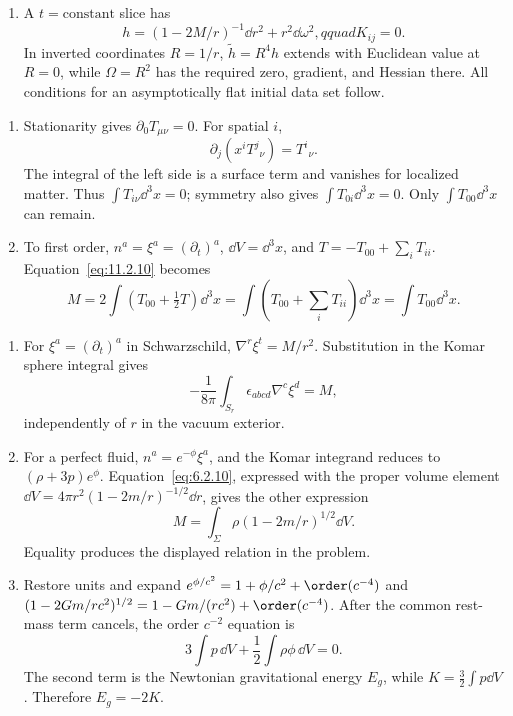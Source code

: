 \begin{enumerate}[leftmargin=2.8em,itemsep=1.2em]
\begin{enumerate}[label=\alph*),leftmargin=2em]
\item A \(t=\text{constant}\) slice has
\[
 h=(1-2M/r)^{-1}\dd r^2+r^2\dd\omega^2,qquad K_{ij}=0.
\]
In inverted coordinates \(R=1/r\), \(\widetilde h=R^4h\) extends with
Euclidean value at \(R=0\), while \(\Omega=R^2\) has the required zero,
gradient, and Hessian there.  All conditions for an asymptotically flat initial
data set follow.
\end{enumerate}

\begin{enumerate}[label=\alph*),leftmargin=2em]
\item Stationarity gives \(\partial_0T_{\mu\nu}=0\).  For spatial \(i\),
\[
 \partial_j(x^iT^{j}{}_{\nu})=T^i{}_{\nu}.
\]
The integral of the left side is a surface term and vanishes for localized
matter.  Thus \(\int T_{i\nu}\dd^3x=0\); symmetry also gives
\(\int T_{0i}\dd^3x=0\).  Only \(\int T_{00}\dd^3x\) can remain.

\item To first order, \(n^a=\xi^a=(\partial_t)^a\), \(\dd V=\dd^3x\),
and \(T=-T_{00}+\sum_iT_{ii}\).  Equation~\eqref{eq:11.2.10} becomes
\[
 M=2\int\left(T_{00}+\tfrac12T\right)\dd^3x
 =\int\left(T_{00}+\sum_iT_{ii}\right)\dd^3x
 =\int T_{00}\dd^3x.
\]
\end{enumerate}

\begin{enumerate}[label=\alph*),leftmargin=2em]
\item For \(\xi^a=(\partial_t)^a\) in Schwarzschild,
\(\nabla^r\xi^t=M/r^2\).  Substitution in the Komar sphere integral gives
\[
 -\frac1{8\pi}\int_{S_r}\epsilon_{abcd}\nabla^c\xi^d=M,
\]
independently of \(r\) in the vacuum exterior.

\item For a perfect fluid, \(n^a=e^{-\phi}\xi^a\), and the Komar integrand
reduces to \((\rho+3p)e^\phi\).  Equation~\eqref{eq:6.2.10}, expressed with
the proper volume element
\(\dd V=4\pi r^2(1-2m/r)^{-1/2}\dd r\), gives the other expression
\[
 M=\int_\Sigma\rho(1-2m/r)^{1/2}\dd V.
\]
Equality produces the displayed relation in the problem.

\item Restore units and expand
\(e^{\phi/c^2}=1+\phi/c^2+\order(c^{-4})\) and
\((1-2Gm/rc^2)^{1/2}=1-Gm/(rc^2)+\order(c^{-4})\).
After the common rest-mass term cancels, the order \(c^{-2}\) equation is
\[
 3\int p\,\dd V+\frac12\int\rho\phi\,\dd V=0.
\]
The second term is the Newtonian gravitational energy \(E_g\), while
\(K=\tfrac32\int p\dd V\).  Therefore \(E_g=-2K\).
\end{enumerate}


\end{enumerate}
